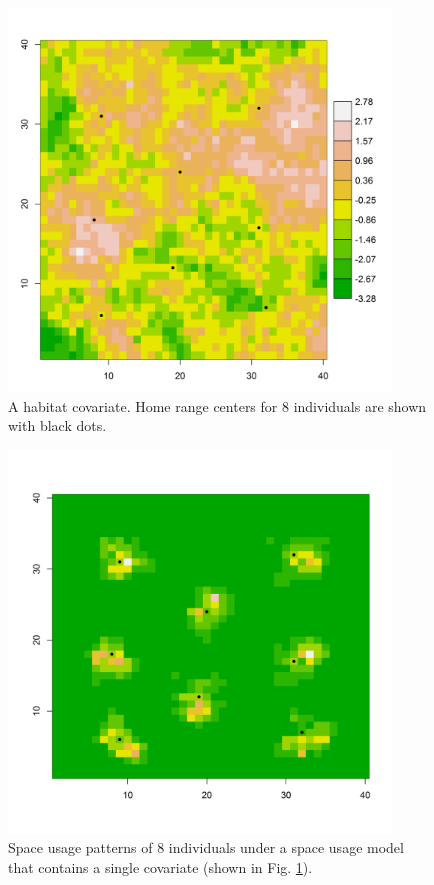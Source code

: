 \begin{figure}[htp]
\centering
\includegraphics[width=4in,height=4in]{Ch10b/figs/habitat}
\caption{A habitat covariate. Home range centers for 8 individuals are
shown with black dots.}
\label{rsf.fig.habitat}
\end{figure}


\begin{figure}[htp]
\centering
\includegraphics[width=4in,height=4in]{Ch10b/figs/homeranges8}
\caption{Space usage patterns of 8 individuals under a space usage
  model that contains a single covariate (shown in
  Fig. \ref{rsf.fig.habitat}).
} 
\label{rsf.fig.homeranges}
\end{figure}



